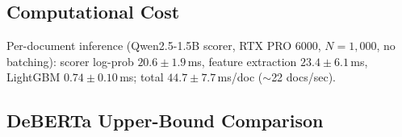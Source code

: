 \begin{table}[h]
\centering
\footnotesize
\caption{Bootstrap $\Kempirical$ stability (1{,}000 resamples). Each row reports the fraction of resamples yielding each $\Kempirical$ value and the resulting 95\% CI. Seven of ten configurations are perfectly stable (100\%); LLaMA-8B C4 at 99.9\%; two boundary cases show mild variability (CI width~1).}
\label{tab:bootstrap_kstar}
\end{table}

\subsection{Computational Cost}
\label{sec:computation_cost}

Per-document inference (Qwen2.5-1.5B scorer, RTX PRO 6000, $N{=}1{,}000$, no batching): scorer log-prob $20.6 \pm 1.9$\,ms, feature extraction $23.4 \pm 6.1$\,ms, LightGBM $0.74 \pm 0.10$\,ms; total $44.7 \pm 7.7$\,ms/doc (${\sim}$22 docs/sec).

\subsection{DeBERTa Upper-Bound Comparison}
\label{sec:deberta_upperbound}

